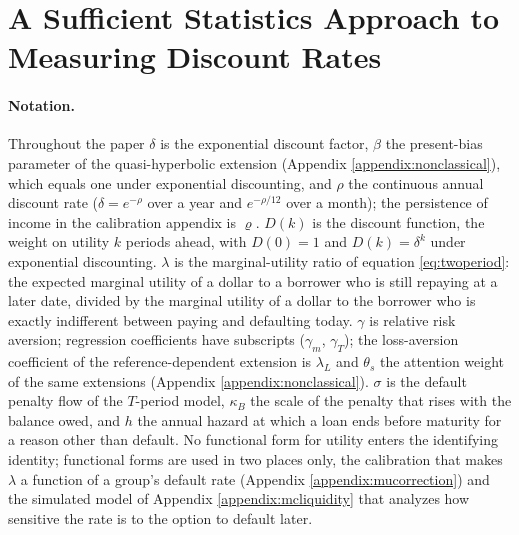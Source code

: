 \section{A Sufficient Statistics Approach to Measuring Discount Rates}\label{sec:suffstats}

\paragraph{Notation.} Throughout the paper $\delta$ is the exponential discount factor, $\beta$ the present-bias parameter of the quasi-hyperbolic extension (Appendix \ref{appendix:nonclassical}), which equals one under exponential discounting, and $\rho$ the continuous annual discount rate ($\delta = e^{-\rho}$ over a year and $e^{-\rho/12}$ over a month); the persistence of income in the calibration appendix is $\varrho$. $D(k)$ is the discount function, the weight on utility $k$ periods ahead, with $D(0) = 1$ and $D(k) = \delta^k$ under exponential discounting. $\lambda$ is the marginal-utility ratio of equation \eqref{eq:twoperiod}: the expected marginal utility of a dollar to a borrower who is still repaying at a later date, divided by the marginal utility of a dollar to the borrower who is exactly indifferent between paying and defaulting today. $\gamma$ is relative risk aversion; regression coefficients have subscripts ($\gamma_m$, $\gamma_T$); the loss-aversion coefficient of the reference-dependent extension is $\lambda_L$ and $\theta_s$ the attention weight of the same extensions (Appendix \ref{appendix:nonclassical}). $\sigma$ is the default penalty flow of the $T$-period model, $\kappa_B$ the scale of the penalty that rises with the balance owed, and $h$ the annual hazard at which a loan ends before maturity for a reason other than default. No functional form for utility enters the identifying identity; functional forms are used in two places only, the calibration that makes $\lambda$ a function of a group's default rate (Appendix \ref{appendix:mucorrection}) and the simulated model of Appendix \ref{appendix:mcliquidity} that analyzes how sensitive the rate is to the option to default later.

